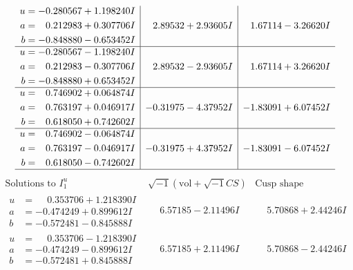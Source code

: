 \documentclass[1p]{elsarticle_modified}
\theoremstyle{definition}
\newcommand{\I}{\sqrt{-1}}
\begin{document}
$$\begin{array}{c|c|c}
\begin{aligned}
u &= -0.280567 + 1.198240 I \\
a &= \phantom{-}0.212983 + 0.307706 I \\
b &= -0.848880 - 0.653452 I\end{aligned}
 & \phantom{-}2.89532 + 2.93605 I & \phantom{-}1.67114 - 3.26620 I \\ \hline\begin{aligned}
u &= -0.280567 - 1.198240 I \\
a &= \phantom{-}0.212983 - 0.307706 I \\
b &= -0.848880 + 0.653452 I\end{aligned}
 & \phantom{-}2.89532 - 2.93605 I & \phantom{-}1.67114 + 3.26620 I \\ \hline\begin{aligned}
u &= \phantom{-}0.746902 + 0.064874 I \\
a &= \phantom{-}0.763197 + 0.046917 I \\
b &= \phantom{-}0.618050 + 0.742602 I\end{aligned}
 & -0.31975 - 4.37952 I & -1.83091 + 6.07452 I \\ \hline\begin{aligned}
u &= \phantom{-}0.746902 - 0.064874 I \\
a &= \phantom{-}0.763197 - 0.046917 I \\
b &= \phantom{-}0.618050 - 0.742602 I\end{aligned}
 & -0.31975 + 4.37952 I & -1.83091 - 6.07452 I\\
 \hline 
 \end{array}$$\newpage$$\begin{array}{c|c|c}  
\text{Solutions to }I^u_{1}& \I (\text{vol} + \sqrt{-1}CS) & \text{Cusp shape}\\
 \hline 
\begin{aligned}
u &= \phantom{-}0.353706 + 1.218390 I \\
a &= -0.474249 + 0.899612 I \\
b &= -0.572481 - 0.845888 I\end{aligned}
 & \phantom{-}6.57185 - 2.11496 I & \phantom{-}5.70868 + 2.44246 I \\ \hline\begin{aligned}
u &= \phantom{-}0.353706 - 1.218390 I \\
a &= -0.474249 - 0.899612 I \\
b &= -0.572481 + 0.845888 I\end{aligned}
 & \phantom{-}6.57185 + 2.11496 I & \phantom{-}5.70868 - 2.44246 I \\ \hline\begin{aligned}

\end{aligned}
\end{array}$$
\end{document}
